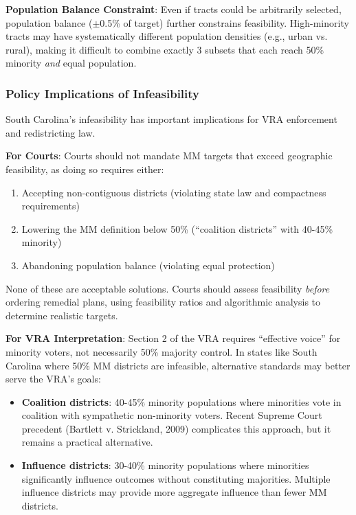 \textbf{Population Balance Constraint}: Even if tracts could be arbitrarily selected, population balance ($\pm$0.5\% of target) further constrains feasibility. High-minority tracts may have systematically different population densities (e.g., urban vs. rural), making it difficult to combine exactly 3 subsets that each reach 50\% minority \emph{and} equal population.

\subsubsection{Policy Implications of Infeasibility}

South Carolina's infeasibility has important implications for VRA enforcement and redistricting law.

\textbf{For Courts}: Courts should not mandate MM targets that exceed geographic feasibility, as doing so requires either:
\begin{enumerate}
    \item Accepting non-contiguous districts (violating state law and compactness requirements)
    \item Lowering the MM definition below 50\% (``coalition districts'' with 40-45\% minority)
    \item Abandoning population balance (violating equal protection)
\end{enumerate}

None of these are acceptable solutions. Courts should assess feasibility \emph{before} ordering remedial plans, using feasibility ratios and algorithmic analysis to determine realistic targets.

\textbf{For VRA Interpretation}: Section 2 of the VRA requires ``effective voice'' for minority voters, not necessarily 50\% majority control. In states like South Carolina where 50\% MM districts are infeasible, alternative standards may better serve the VRA's goals:
\begin{itemize}
    \item \textbf{Coalition districts}: 40-45\% minority populations where minorities vote in coalition with sympathetic non-minority voters. Recent Supreme Court precedent (Bartlett v. Strickland, 2009) complicates this approach, but it remains a practical alternative.
    \item \textbf{Influence districts}: 30-40\% minority populations where minorities significantly influence outcomes without constituting majorities. Multiple influence districts may provide more aggregate influence than fewer MM districts.
\end{itemize}

